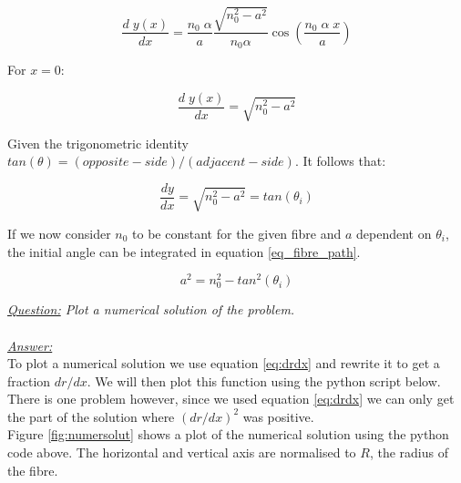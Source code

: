\documentclass{article}
\begin{document}
\begin{equation*}
	\frac{d \; y(x)}{dx} =  \frac{n_0 \; \alpha}{a} \frac{\sqrt{n_0^2-a^2} }{n_0 \alpha} \cos \left( \frac{n_0 \; \alpha \; x}{a}\right)
\end{equation*}

For $x=0$:

\begin{equation*}
	\frac{d \; y(x)}{dx} =  \sqrt{n_0^2-a^2}
\end{equation*}

Given the trigonometric identity $tan (\theta) = (opposite-side)/(adjacent-side)$. It follows that:

\begin{equation*}
	\frac{dy}{dx} =  \sqrt{n_0^2-a^2} = tan (\theta _i)
\end{equation*}

If we now consider $n_0$ to be constant for the given fibre and $a$ dependent on $\theta _i$, the initial angle can be integrated in equation \ref{eq_fibre_path}.

\begin{equation}
	a ^2 = n_0 ^2 - tan ^2 (\theta _i)
\end{equation}

\textit{\underline{Question:} Plot a numerical solution of the problem.}\\
\\
\textit{\underline{Answer:}} \\
To plot a numerical solution we use equation \ref{eq:drdx} and rewrite it to get a fraction $dr/dx$. We will then plot this function using the python script below. There is one problem however, since we used equation  \ref{eq:drdx} we can only get the part of the solution where $(dr/dx)^2$ was positive.\\



Figure \ref{fig:numersolut} shows a plot of the numerical solution using the python code above. The horizontal and vertical axis are normalised to $R$, the radius of the fibre.\\
\end{document}

